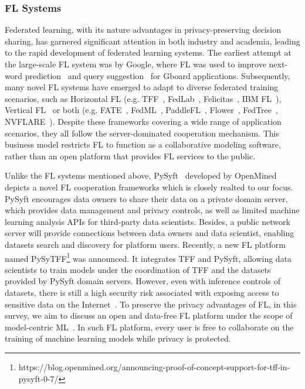 \subsubsection{FL Systems}
\label{sec:flsystems}
Federated learning, with its nature advantages in privacy-preserving decision sharing, has garnered significant attention in both industry and academia, leading to the rapid development of federated learning systems.
The earliest attempt at the large-scale FL system was by Google, where FL was used to improve next-word prediction~\cite{hard2018federated} and query suggestion~\cite{yang2018applied} for Gboard applications.
Subsequently, many novel FL systems have emerged to adapt to diverse federated training scenarios, such as Horizontal FL (e.g. TFF~\cite{abadi2016tensorflow}, FedLab~\cite{zeng2021fedlab}, Felicitas~\cite{zhang2022felicitas}, IBM FL~\cite{ibmfl2020ibm}), Vertical FL~\cite{wu2022practical} or both (e.g. FATE~\cite{liu2021fate}, FedML~\cite{he2020fedml}, PaddleFL~\cite{ma2019paddlepaddle}, Flower~\cite{beutel2020flower}, FedTree~\cite{li2022fedtree}, NVFLARE~\cite{roth2022nvidia}).
Despite these frameworks covering a wide range of application scenarios, they all follow the server-dominated cooperation mechanism.
This business model restricts FL to function as a collaborative modeling software, rather than an open platform that provides FL services to the public.

Unlike the FL systems mentioned above, PySyft~\cite{ziller2021pysyft} developed by OpenMined depicts a novel FL cooperation frameworks which is closely realted to our focus. 
PySyft encourages data owners to share their data on a private domain server, which provides data management and privacy controls, as well as limited machine learning analysis APIs for third-party data scientists.
Besides, a public network server will provide connections between data owners and data scientist, enabling datasets search and discovery for platform users.
Recently, a new FL platform named PySyTFF\footnote{https://blog.openmined.org/announcing-proof-of-concept-support-for-tff-in-pysyft-0-7/} was announced. It integrates TFF and PySyft, allowing data scientists to train models under the coordination of TFF and the datasets provided by PySyft domain servers.
However, even with inference controls of datasets, there is still a high security risk associated with exposing access to sensitive data on the Internet~\cite{gamundani2018review}.
To preserve the privacy advantages of FL, in this survey, we aim to discuss an open and data-free FL platform under the scope of model-centric ML~\cite{lou2020towards}.
In such FL platform, every user is free to collaborate on the training of machine learning models while privacy is protected.

